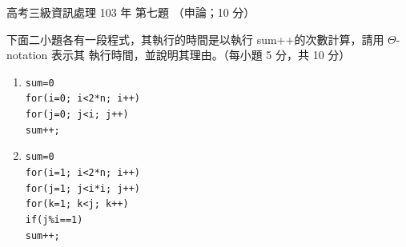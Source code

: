 \begin{pastexam}[label={px:gk3-103-ds-07}]{高考三級資訊處理 103 年 第七題}
（申論；10 分）

下面二小題各有一段程式，其執行的時間是以執行 sum++的次數計算，請用 $\Theta$-notation 表示其
執行時間，並說明其理由。（每小題 5 分，共 10 分）
\begin{enumerate}[leftmargin=2.2em]
\item[㈠] \texttt{sum=0}\\
\texttt{for(i=0; i<2*n; i++)}\\
\hspace*{1.5em}\texttt{for(j=0; j<i; j++)}\\
\hspace*{3em}\texttt{sum++;}
\item[㈡] \texttt{sum=0}\\
\texttt{for(i=1; i<2*n; i++)}\\
\hspace*{1.5em}\texttt{for(j=1; j<i*i; j++)}\\
\hspace*{3em}\texttt{for(k=1; k<j; k++)}\\
\hspace*{4.5em}\texttt{if(j\%i==1)}\\
\hspace*{6em}\texttt{sum++;}
\end{enumerate}
\end{pastexam}

